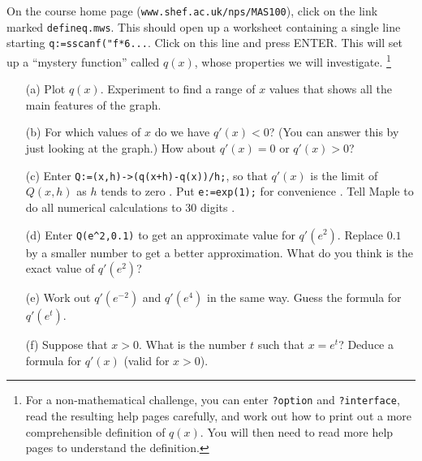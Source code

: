 \documentclass[a4paper,10pt]{amsbook}
\numberwithin{example}{chapter}
\begin{document}
\begin{exercise}\label{ex-Li}
 On the course home page (\verb~www.shef.ac.uk/nps/MAS100~), click on
 the link marked \verb~defineq.mws~.  This should open up a worksheet 
 containing a single line starting
 \verb~q:=sscanf("f*6...~.  Click on this line and press
 ENTER.  This will set up a ``mystery function'' called
 $q(x)$, whose properties we will investigate. 
 \footnote{For a non-mathematical challenge, you can enter
  \verb~?option~ and \verb~?interface~, read the resulting help pages
  carefully, and work out how to print out a more
  comprehensible definition of $q(x)$.  You will then need
  to read more help pages to understand the definition. 
 }
 \begin{itemize}
  \item[(a)] Plot $q(x)$.  Experiment to find a range of $x$ values
   that shows all the main features of the graph. 
  \item[(b)] For which values of $x$ do we have $q'(x)<0$?  (You can
   answer this by just looking at the graph.)  How about $q'(x)=0$ or
   $q'(x)>0$? 
  \item[(c)] Enter \verb~Q:=(x,h)->(q(x+h)-q(x))/h;~, so that $q'(x)$
   is the limit of $Q(x,h)$ as $h$ tends to zero
   \note{\NOTEmultifunc}.  Put \verb~e:=exp(1);~ for
   convenience \note{\NOTEexp}.  Tell Maple to do all numerical
   calculations to 30 digits \note{\NOTEdigits}. 
  \item[(d)] Enter \verb~Q(e^2,0.1)~ to get an approximate value for
   $q'(e^2)$.  Replace $0.1$ by a smaller number to get a better
   approximation.  What do you think is the exact value of $q'(e^2)$? 
  \item[(e)] Work out $q'(e^{-2})$ and $q'(e^4)$ in the same way. 
   Guess the formula for $q'(e^t)$. 
  \item[(f)] Suppose that $x>0$.  What is the number $t$
   such that $x=e^t$?  Deduce a formula for $q'(x)$ (valid for $x>0$). 
 \end{itemize}
\end{exercise}
\end{document}
